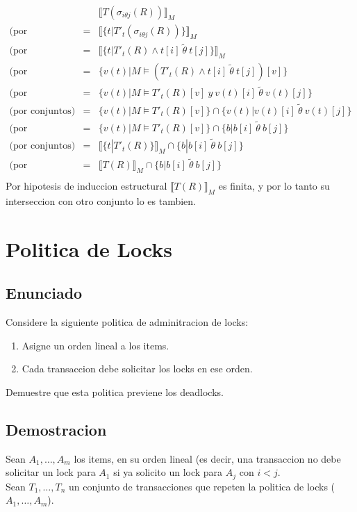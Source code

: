 \documentclass[a4paper]{article}
\begin{document}
		\begin{eqnarray*}
			&& \llbracket T(\sigma _{i \theta j}(R))\rrbracket _M \\
			\mbox{(por traduccion)} & = & \llbracket \{t|T'_t(\sigma _{i \theta j}(R))\}\rrbracket _M \\
			\mbox{(por traduccion)} & = & \llbracket \{t|T'_t(R) \wedge t[i] \ \widetilde{\theta} \ t[j] \}\rrbracket _M \\
			\mbox{(por semantica)} & = & \{v(t)|M \models (T'_t(R) \wedge t[i] \ \widetilde{\theta} \ t[j])[v]\} \\
			\mbox{(por semantica)} & = & \{v(t)|M \models T'_t(R)[v] \ y \ v(t)[i] \ \widetilde{\theta} \ v(t)[j]\} \\
			\mbox{(por conjuntos)} & = & \{v(t)|M \models T'_t(R)[v] \} \cap \{v(t)|v(t)[i] \ \widetilde{\theta} \ v(t)[j]\} \\
			\mbox{(por reescritura)} & = & \{v(t)|M \models T'_t(R)[v] \} \cap \{b|b[i] \ \widetilde{\theta} \ b[j]\} \\
			\mbox{(por conjuntos)} & = & \llbracket \{t|T'_t(R)\}\rrbracket _M \cap \{b|b[i] \ \widetilde{\theta} \ b[j]\} \\
			\mbox{(por traduccion)} & = & \llbracket T(R)\rrbracket _M \cap \{b|b[i] \ \widetilde{\theta} \ b[j]\} \\
		\end{eqnarray*}
		Por hipotesis de induccion estructural $\llbracket T(R)\rrbracket _M$ es finita, y por lo tanto su interseccion con otro conjunto lo es tambien.

	\section{Politica de Locks}
	\subsection{Enunciado}
	Considere la siguiente politica de adminitracion de locks:
	\begin{enumerate}
		\item Asigne un orden lineal a los items.
		\item Cada transaccion debe solicitar los locks en ese orden.
	\end{enumerate}
	Demuestre que esta politica previene los deadlocks.
	\subsection{Demostracion}
	Sean $A_1,\ldots,A_m$ los items, en su orden lineal (es decir, una transaccion no debe solicitar un lock para $A_1$ si ya solicito un lock para $A_j$ con $i<j$.\\
	Sean $T_1,\ldots,T_n$ un conjunto de transacciones que repeten la politica de locks ($A_1,\ldots,A_m$).\\
	
\end{document}
